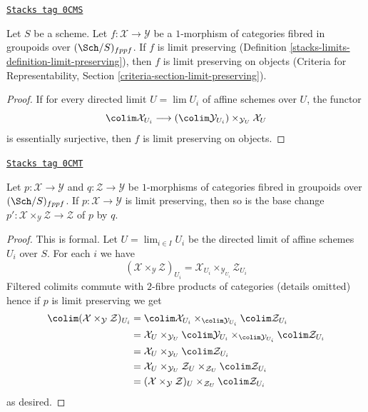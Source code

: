 \begin{lemma}
\label{stacks-limits-lemma-limit-preserving-objects}
\href{https://stacks.math.columbia.edu/tag/0CMS}{\texttt{Stacks tag 0CMS}}

Let $S$ be a scheme. Let $f : \mathcal{X} \to \mathcal{Y}$ be a
$1$-morphism of categories fibred in groupoids over $(\Sch/S)_{fppf}$.
If $f$ is limit preserving (Definition \ref{stacks-limits-definition-limit-preserving}),
then $f$ is limit preserving on objects (Criteria for Representability, Section
\ref{criteria-section-limit-preserving}).
\end{lemma}

\begin{proof}
If for every directed limit $U = \lim U_i$ of affine schemes over $U$,
the functor
$$
\colim \mathcal{X}_{U_i} \longrightarrow
(\colim \mathcal{Y}_{U_i}) \times_{\mathcal{Y}_U} \mathcal{X}_U
$$
is essentially surjective, then $f$ is limit preserving on objects.
\end{proof}

\begin{lemma}
\label{stacks-limits-lemma-base-change-limit-preserving}
\href{https://stacks.math.columbia.edu/tag/0CMT}{\texttt{Stacks tag 0CMT}}

Let $p : \mathcal{X} \to \mathcal{Y}$ and $q : \mathcal{Z} \to \mathcal{Y}$
be $1$-morphisms of categories fibred in groupoids over $(\Sch/S)_{fppf}$.
If $p : \mathcal{X} \to \mathcal{Y}$ is limit preserving, then so
is the base change
$p' : \mathcal{X} \times_\mathcal{Y} \mathcal{Z} \to \mathcal{Z}$
of $p$ by $q$.
\end{lemma}

\begin{proof}
This is formal. Let $U = \lim_{i \in I} U_i$ be the directed limit
of affine schemes $U_i$ over $S$. For each $i$ we have
$$
(\mathcal{X} \times_\mathcal{Y} \mathcal{Z})_{U_i} =
\mathcal{X}_{U_i} \times_{\mathcal{Y}_{U_i}} \mathcal{Z}_{U_i}
$$
Filtered colimits commute with $2$-fibre products of categories
(details omitted) hence if $p$ is limit preserving we get
\begin{align*}
\colim (\mathcal{X} \times_\mathcal{Y} \mathcal{Z})_{U_i}
& =
\colim \mathcal{X}_{U_i} \times_{\colim \mathcal{Y}_{U_i}}
\colim \mathcal{Z}_{U_i} \\
& =
\mathcal{X}_U \times_{\mathcal{Y}_U} \colim \mathcal{Y}_{U_i}
\times_{\colim \mathcal{Y}_{U_i}}
\colim \mathcal{Z}_{U_i} \\
& =
\mathcal{X}_U \times_{\mathcal{Y}_U} \colim \mathcal{Z}_{U_i} \\
& =
\mathcal{X}_U \times_{\mathcal{Y}_U} \mathcal{Z}_U \times_{\mathcal{Z}_U}
\colim \mathcal{Z}_{U_i} \\
& =
(\mathcal{X} \times_\mathcal{Y} \mathcal{Z})_U \times_{\mathcal{Z}_U}
\colim \mathcal{Z}_{U_i}
\end{align*}
as desired.
\end{proof}

